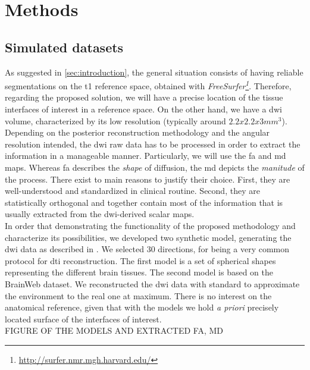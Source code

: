 \section{Methods}
\label{sec:methods}
%
\subsection{Simulated datasets}
%
As suggested in \autoref{sec:introduction}, the general situation 
consists of having reliable segmentations on the \ac{t1} reference
space, obtained with 
\emph{FreeSurfer\footnote{\url{http://surfer.nmr.mgh.harvard.edu/}}}.
Therefore, regarding the proposed solution, we will have a precise
location of the tissue interfaces of interest in a reference space.
On the other hand, we have a \ac{dwi} volume, characterized by its
low resolution (typically around $2.2x2.2x3mm^3$). Depending on the
posterior reconstruction methodology and the angular resolution
intended, the \ac{dwi} raw data has to be processed in order to
extract the information in a manageable manner. Particularly, we
will use the \ac{fa} and \ac{md} maps. Whereas \ac{fa} describes
the \emph{shape} of diffusion, the \ac{md} depicts the
\emph{manitude} of the process. There exist to main reasons to 
justify their choice. First, they are well-understood and
standardized in clinical routine. Second, they are statistically 
orthogonal and together contain most of the information that is
usually extracted from the \ac{dwi}-derived scalar maps. \\
In order that demonstrating the functionality of the proposed
methodology and characterize its possibilities, we developed two
synthetic model, generating the \ac{dwi} data as described in
 \citep{tuch_q-ball_2004}. We selected 30 directions, for being
a very common protocol for \ac{dti} reconstruction. The first model
is a set of spherical shapes representing the different brain
tissues. The second model is based on the BrainWeb dataset. We
reconstructed the \ac{dwi} data with standard to approximate the
environment to the real one at maximum. There is no interest on the
anatomical reference, given that with the models we hold \emph{a priori}
precisely located surface of the interfaces of interest. \\

FIGURE OF THE MODELS AND EXTRACTED FA, MD

